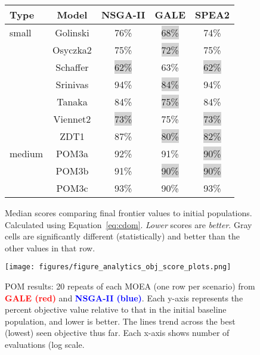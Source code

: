 \documentclass[10pt,journal,compsoc]{IEEEtran}
\newcommand{\eq}[1]{Equation~\ref{eq:#1}}
\begin{document}
\begin{figure}
\begin{center}
\footnotesize
\begin{tabular}{lc@{~}|c@{~}|c@{~}|c@{~}} 
Type&Model      & NSGA-II      & GALE         & SPEA2 \\ \hline 
small&Golinski   & 76\%         & \colorbox{lightgray}{68\%}         & 74\%  \\ 
&Osyczka2   & 75\%         & \colorbox{lightgray}{72\%}         & 75\%  \\ 
&Schaffer   & \colorbox{lightgray}{62\%}         & 63\%         & \colorbox{lightgray}{62\%}  \\ 
&Srinivas   & 94\%         & \colorbox{lightgray}{84\%}         & 94\%  \\ 
&Tanaka     & 84\%         & \colorbox{lightgray}{75\%}         & 84\%  \\ 
&Viennet2   & \colorbox{lightgray}{73\%}         & 75\%         & \colorbox{lightgray}{73\%}  \\
&ZDT1       & 87\%         & \colorbox{lightgray}{80\%}         & \colorbox{lightgray}{82\%}  \\ \hline 
medium &POM3a      & 92\%         & 91\%         & \colorbox{lightgray}{90\%}  \\
&POM3b      & 91\%         & \colorbox{lightgray}{90\%}         & \colorbox{lightgray}{90\%}  \\ 
&POM3c      & 93\%         & 90\%         & 93\% 
\end{tabular}
\end{center}
\caption{Median scores comparing final frontier values
to initial populations. Calculated using \eq{cdom}.
{\em Lower} scores are {\em better}.
Gray cells are significantly
different (statistically) and better than the other values in that row.}
\label{fig:scores}
\end{figure}



\begin{figure*}[!t]
\texttt{[image: figures/figure\_analytics\_obj\_score\_plots.png]}
\caption{POM results: 20 repeats of each MOEA (one row
per scenario) from
\textcolor{red}{{\bf GALE (red)}}
and 
 \textcolor{blue}{{\bf NSGA-II (blue)}}. Each y-axis represents the percent objective value relative
to that in the initial baseline population, and lower is better.
The lines trend across the best (lowest) seen objective thus far.  Each x-axis shows number of evaluations (log scale. }
\label{fig:zdt1objspace}
\end{figure*}
\end{document}
